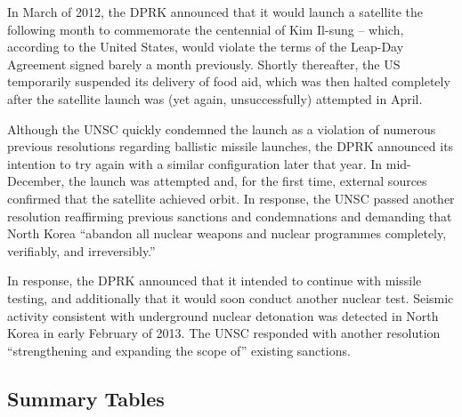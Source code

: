 \documentclass{article}
\begin{document}
In March of 2012, the DPRK announced that it would launch a satellite the following month to commemorate the centennial of Kim Il-sung – which, according to the United States, would violate the terms of the Leap-Day Agreement signed barely a month previously\cite{davenport}. Shortly thereafter, the US temporarily suspended its delivery of food aid, which was then halted completely after the satellite launch was (yet again, unsuccessfully) attempted in April\cite{davenport}.

Although the UNSC quickly condemned the launch as a violation of numerous previous resolutions regarding ballistic missile launches\cite{unsc12}, the DPRK announced its intention to try again with a similar configuration later that year. In mid-December, the launch was attempted and, for the first time, external sources confirmed that the satellite achieved orbit\cite{davenport}. In response, the UNSC passed another resolution reaffirming previous sanctions and condemnations and demanding that North Korea “abandon all nuclear weapons and nuclear programmes completely, verifiably, and irreversibly.” \cite{unsc13}

In response, the DPRK announced that it intended to continue with missile testing, and additionally that it would soon conduct another nuclear test\cite{davenport}. Seismic activity consistent with underground nuclear detonation was detected in North Korea in early February of 2013\cite{davenport}. The UNSC responded with another resolution “strengthening and expanding the scope of” existing sanctions\cite{unsc13m}.

\subsection{Summary Tables}
\end{document}
